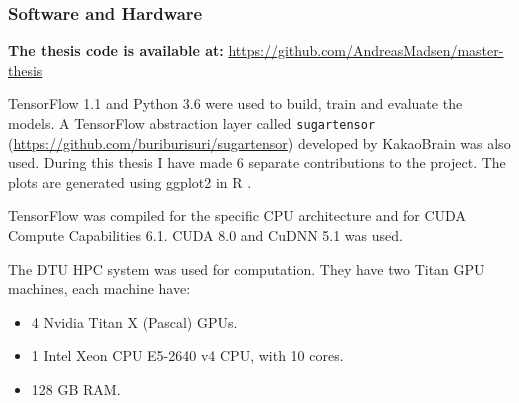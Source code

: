 \subsubsection{Software and Hardware}

\textbf{The thesis code is available at: } \url{https://github.com/AndreasMadsen/master-thesis}

TensorFlow 1.1 \cite{tensorflow2015-whitepaper} and Python 3.6 were used to build, train and evaluate the models. A TensorFlow abstraction layer called \texttt{sugartensor} (\url{https://github.com/buriburisuri/sugartensor}) developed by KakaoBrain was also used. During this thesis I have made 6 separate contributions to the project. The plots are generated using ggplot2 \cite{ggplot2} in R .

TensorFlow was compiled for the specific CPU architecture and for CUDA Compute Capabilities 6.1. CUDA 8.0 and CuDNN 5.1 was used.

The DTU HPC system was used for computation. They have two Titan GPU machines, each machine have:
\begin{itemize}[noitemsep]
\item 4 Nvidia Titan X (Pascal) GPUs.
\item 1 Intel Xeon CPU E5-2640 v4 CPU, with 10 cores.
\item 128 GB RAM.
\end{itemize}
